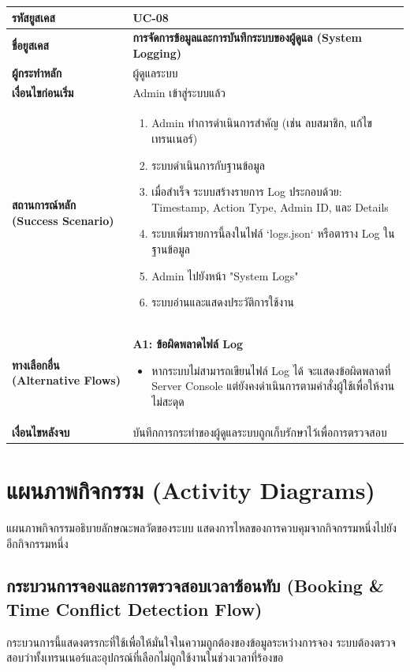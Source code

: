 \begin{longtable}{|p{3cm}|p{12cm}|}
\hline
\textbf{รหัสยูสเคส} & UC-08 \\ \hline
\textbf{ชื่อยูสเคส} & \textbf{การจัดการข้อมูลและการบันทึกระบบของผู้ดูแล (System Logging)} \\ \hline
\textbf{ผู้กระทำหลัก} & ผู้ดูแลระบบ \\ \hline
\textbf{เงื่อนไขก่อนเริ่ม} & Admin เข้าสู่ระบบแล้ว \\ \hline
\textbf{สถานการณ์หลัก (Success Scenario)} & 
\begin{enumerate}
    \item Admin ทำการดำเนินการสำคัญ (เช่น ลบสมาชิก, แก้ไขเทรนเนอร์)
    \item ระบบดำเนินการกับฐานข้อมูล
    \item เมื่อสำเร็จ ระบบสร้างรายการ Log ประกอบด้วย: Timestamp, Action Type, Admin ID, และ Details
    \item ระบบเพิ่มรายการนี้ลงในไฟล์ `logs.json` หรือตาราง Log ในฐานข้อมูล
    \item Admin ไปยังหน้า "System Logs"
    \item ระบบอ่านและแสดงประวัติการใช้งาน
\end{enumerate} \\ \hline
\textbf{ทางเลือกอื่น (Alternative Flows)} & 
\textbf{A1: ข้อผิดพลาดไฟล์ Log}
\begin{itemize}
    \item หากระบบไม่สามารถเขียนไฟล์ Log ได้ จะแสดงข้อผิดพลาดที่ Server Console แต่ยังคงดำเนินการตามคำสั่งผู้ใช้เพื่อให้งานไม่สะดุด
\end{itemize} \\ \hline
\textbf{เงื่อนไขหลังจบ} & บันทึกการกระทำของผู้ดูแลระบบถูกเก็บรักษาไว้เพื่อการตรวจสอบ \\ \hline
\end{longtable}

\newpage
\section{แผนภาพกิจกรรม (Activity Diagrams)}
แผนภาพกิจกรรมอธิบายลักษณะพลวัตของระบบ แสดงการไหลของการควบคุมจากกิจกรรมหนึ่งไปยังอีกกิจกรรมหนึ่ง

\subsection{กระบวนการจองและการตรวจสอบเวลาซ้อนทับ (Booking \& Time Conflict Detection Flow)}
กระบวนการนี้แสดงตรรกะที่ใช้เพื่อให้มั่นใจในความถูกต้องของข้อมูลระหว่างการจอง ระบบต้องตรวจสอบว่าทั้งเทรนเนอร์และอุปกรณ์ที่เลือกไม่ถูกใช้งานในช่วงเวลาที่ร้องขอ

